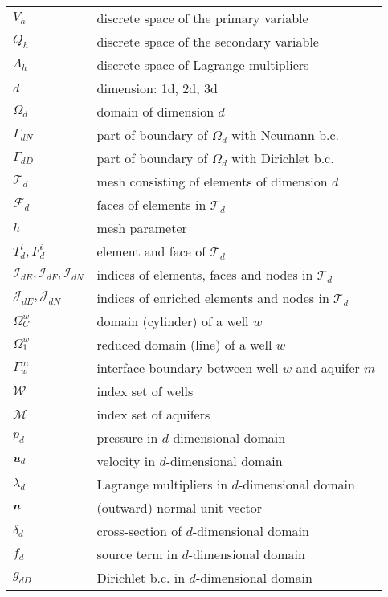 \begin{tabularx}{0.9\linewidth}{@{}lX@{}}
$V_h$ & discrete space of the primary variable \\
$Q_h$ & discrete space of the secondary variable \\
$\Lambda_h$ & discrete space of Lagrange multipliers\\
$d$ & dimension: 1d, 2d, 3d \\
$\Omega_d$ & domain of dimension $d$ \\
$\Gamma_{dN}$ & part of boundary of $\Omega_d$ with Neumann b.c. \\
$\Gamma_{dD}$ & part of boundary of $\Omega_d$ with Dirichlet b.c. \\
$\mathcal T_d$ & mesh consisting of elements of dimension $d$ \\
$\mathcal F_d$ & faces of elements in $\mathcal T_d$ \\
$h$ & mesh parameter \\
$T^i_d, F^i_d$  & element and face of $\mathcal T_d$ \\
$\mathcal I_{dE}, \mathcal I_{dF}, \mathcal I_{dN}$ & indices of elements, faces and nodes in $\mathcal T_d$ \\
$\mathcal J_{dE}, \mathcal J_{dN}$ & indices of enriched elements and nodes in $\mathcal T_d$ \\
$\Omega^w_C$ & domain (cylinder) of a well $w$ \\
$\Omega^w_1$ & reduced domain (line) of a well $w$ \\
$\Gamma^m_w$ & interface boundary between well $w$ and aquifer $m$ \\
$\mathcal W$ & index set of wells \\
$\mathcal M$ & index set of aquifers \\
$p_d$ & pressure in $d$-dimensional domain \\
$\mathbf{\boldsymbol{u}}_d$ & velocity in $d$-dimensional domain \\
$\lambda_d$ & Lagrange multipliers in $d$-dimensional domain \\
$\mathbf{\boldsymbol{n}}$ & (outward) normal unit vector \\
$\delta_d$ & cross-section of $d$-dimensional domain \\
$f_d$ & source term in $d$-dimensional domain \\
$g_{dD}$ & Dirichlet b.c. in $d$-dimensional domain \\

\end{tabularx}

